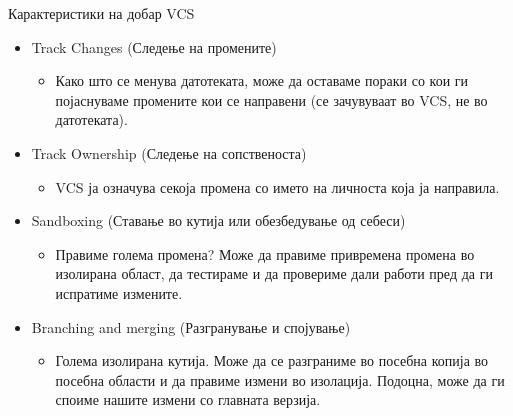 \begin{frame}{Карактеристики на добар VCS}
\begin{itemize}
    \item Track Changes (Следење на промените)
    \begin{itemize} 
        \item Како што се менува датотеката, може да оставаме пораки со кои ги
        појаснуваме промените кои се направени (се зачувуваат во VCS, не во
        датотеката).
    \end{itemize}
    \pause
    \item Track Ownership (Следење на сопственоста)
    \begin{itemize} 
        \item VCS ја означува секоја промена со името на личноста која ја
        направила.
    \end{itemize}
    \pause
    \item Sandboxing (Ставање во кутија или обезбедување од себеси)
    \begin{itemize} 
        \item Правиме голема промена? Може да правиме привремена промена
        во изолирана област, да тестираме и да провериме дали работи пред
        да ги испратиме измените.
    \end{itemize}
    \pause
    \item Branching and merging (Разгранување и спојување)
    \begin{itemize} 
        \item Голема изолирана кутија. Може да се разграниме во посебна копија
        во посебна области и да правиме измени во изолација. Подоцна, може да
        ги споиме нашите измени со главната верзија.
    \end{itemize}
\end{itemize}
\end{frame}

